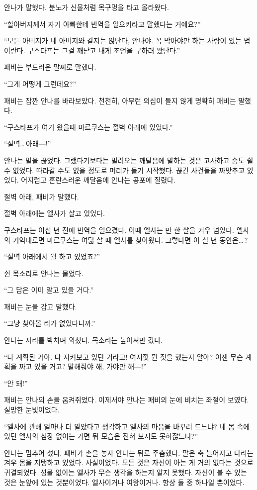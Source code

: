 안나가 말했다. 분노가 신물처럼 목구멍을 타고 올라왔다.

``할아버지께서 자기 아빠한테 반역을 일으키라고 말했다는 거예요?''

``모든 아버지가 네 아버지와 같지는 않단다, 안나야. 꼭 막아야만 하는 사람이 있는 법이란다. 구스타프는 그걸 깨닫고 내게 조언을 구하러 왔단다.''

패비는 부드러운 말씨로 말했다.

``그게 어떻게 그런데요?''

패비는 잠깐 안나를 바라보았다. 천천히, 아무런 의심이 들지 않게 명확히 패비는 말했다.

``구스타프가 여기 왔을때 마르쿠스는 절벽 아래에 있었다.''

``절벽\ldots\,아래—!''

안나는 말을 끊었다. 그랬다기보다는 밀려오는 깨달음에 말하는 것은 고사하고 숨도 쉴 수 없었다. 따라갈 수도 없을 정도로 머리가 돌기 시작했다. 끊긴 사건들을 짜맞추고 있었다. 어지럽고 혼란스러운 깨달음에 안나는 공포에 질렸다.

절벽 아래, 패비가 말했다.

절벽 아래에는 엘사가 살고 있었다.

구스타프는 이십 년 전에 반역을 일으켰다. 이때 엘사는 만 한 살을 겨우 넘었다. 엘사의 기억대로면 마르쿠스는 여덟 살 때 엘사를 찾아왔다. 그렇다면 이 칠 년 동안은\ldots\,?

``절벽 아래에서 뭘 하고 있었죠?''

쉰 목소리로 안나는 물었다.

``그 답은 이미 알고 있을 거다.''

패비는 눈을 감고 말했다.

``그냥 찾아올 리가 없었다니까.''

안나는 자리를 박차며 외쳤다. 목소리는 높아져만 갔다.

``다 계획된 거야. 다 지켜보고 있던 거라고! 여지껏 뭔 짓을 했는지 알아? 이젠 무슨 계획을 짜고 있을 거고? 말해줘야 해, 가야만 해—!''

``안 돼!''

패비는 안나의 손을 움켜쥐었다. 이제서야 안나는 패비의 눈에 비치는 좌절이 보였다. 실망한 눈빛이었다.

``엘사에 관해 얼마나 더 알았다고 생각하고 엘사의 마음을 바꾸려 드느냐? 네 몸 속에 있던 엘사의 심장 없이는 가면 뒤 모습은 전혀 보지도 못하잖느냐?''

안나는 멈추어 섰다. 패비가 손을 놓자 안나는 뒤로 주춤했다. 팔은 축 늘어지고 다리는 겨우 몸을 지탱하고 있었다. 사실이었다. 모든 것은 자신이 아는 게 거의 없다는 것으로 귀결되었다. 성물 없이는 엘사가 무슨 생각을 하는지 알지 못했다. 자신이 볼 수 있는 것은 눈앞에 있는 것뿐이었다. 엘사이거나 여왕이거나. 항상 둘 중 하나일 뿐이었다.

